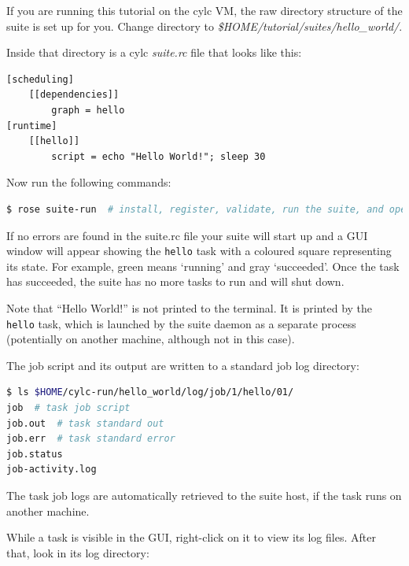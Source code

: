 \begin{shaded*}

If you are running this tutorial on the cylc VM, the raw directory structure of the suite is set up for you. Change directory to {\em \$HOME/tutorial/suites/hello\_world/}. 

Inside that directory is a cylc {\em suite.rc} file that looks like this:

\begin{lstlisting}[language=suiterc]
[scheduling]
    [[dependencies]]
        graph = hello
[runtime]
    [[hello]]
        script = echo "Hello World!"; sleep 30
\end{lstlisting}

Now run the following commands:

\begin{lstlisting}[language=bash]
$ rose suite-run  # install, register, validate, run the suite, and open the GUI
\end{lstlisting}

If no errors are found in the suite.rc file your suite will start up and a
GUI window will appear showing the \lstinline{hello} task with a coloured
square representing its state. For example, green means `running' and gray
`succeeded'.  Once the task has succeeded, the suite has no more tasks to run
and will shut down.

Note that ``Hello World!'' is not printed to the terminal. It is printed by 
the \lstinline=hello= task, which is launched by the suite daemon as a separate
process (potentially on another machine, although not in this case).


The job script and its output are written to a standard job log directory:

\begin{lstlisting}[language=bash]
$ ls $HOME/cylc-run/hello_world/log/job/1/hello/01/
job  # task job script
job.out  # task standard out
job.err  # task standard error
job.status
job-activity.log
\end{lstlisting}

The task job logs are automatically retrieved to the suite host, if the task
runs on another machine.

While a task is visible in the GUI, right-click on it to view its log files.
After that, look in its log directory:


\end{shaded*}
